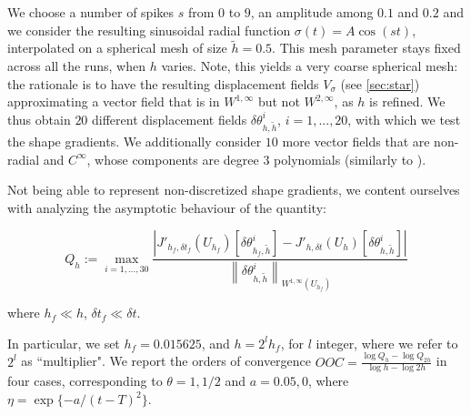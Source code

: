 \documentclass[english,a4paper,10pt,oneside]{scrbook}	%
\theoremstyle{break}
\theoremstyle{remark}
\newcommand{\ds}{\displaystyle}
\newcommand{\norm}[1]{\left\lVert#1\right\rVert}
\newcommand{\te}{\theta}
\begin{document}
We choose a number of spikes $s$ from $0$ to $9$, an amplitude among $0.1$ and $0.2$ and we consider the resulting sinusoidal radial function $\sigma(t) = A \cos(st)$, interpolated on a spherical mesh of size $\tilde{h} = 0.5$. This mesh parameter stays fixed across all the runs, when $h$ varies. Note, this yields a very coarse spherical mesh: the rationale is to have the resulting displacement fields $V_\sigma$ (see \cref{sec:star}) approximating a vector field that is in $W^{1,\infty}$ but not $W^{2,\infty}$, as $h$ is refined. We thus obtain  $20$ different displacement fields $\delta \te_{h,\tilde{h}}^i$, $i=1,...,20$, with which we test the shape gradients.  We additionally consider $10$ more vector fields that are non-radial and $C^\infty$, whose components are degree $3$ polynomials (similarly to \cite{paganini}). 


Not being able to represent non-discretized shape gradients, we content ourselves with analyzing the asymptotic behaviour of the quantity:

$$Q_h:=\max_{i=1,...,30}\frac{|J'_{h_f,\delta t_f}(U_{h_f})[\delta \te_{h_f,\tilde{h}}^i]-J'_{h,\delta t}(U_h)[\delta \te_{h,\tilde{h}}^i]|}{\norm{\delta \te_{h,\tilde{h}}^i}_{W^{1,\infty}(U_{h_f})}}$$

where $h_f \ll h$, $\delta t_f \ll \delta t$.

In particular, we set $h_f = 0.015625$, and $h = 2^{l} h_f$, for $l$ integer, where we refer to $2^l$ as ``multiplier". We report the orders of convergence $\ds OOC =  \frac{\log Q_h-\log Q_{2h}}{\log h - \log 2h}$ in four cases, corresponding to $\theta =1, 1/2$ and $a = 0.05, 0$, where $\eta =\exp\{-a/(t-T)^2\} $.
%
\end{document}
